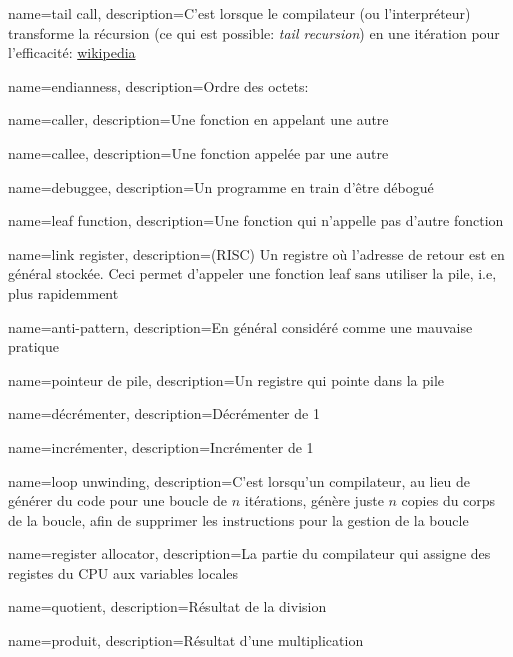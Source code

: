 {
  name={tail call},
  description={C'est lorsque le compilateur (ou l'interpréteur) transforme la récursion (ce qui est possible: \emph{tail recursion})
  en une itération pour l'efficacité: \href{http://en.wikipedia.org/wiki/Tail_call}{wikipedia}}
}

{
  name=endianness,
  description={Ordre des octets: }
}

{
  name=caller,
  description={Une fonction en appelant une autre}
}

{
  name=callee,
  description={Une fonction appelée par une autre}
}

{
  name=debuggee,
  description={Un programme en train d'être débogué}
}

{
  name=leaf function,
  description={Une fonction qui n'appelle pas d'autre fonction}
}

{
  name=link register,
  description={(RISC) Un registre où l'adresse de retour est en général stockée. Ceci permet
  d'appeler une fonction leaf sans utiliser la pile, i.e, plus rapidemment}
}

{
  name=anti-pattern,
  description={En général considéré comme une mauvaise pratique}
}

{
  name=pointeur de pile,
  description={Un registre qui pointe dans la pile}
}

{
  name=décrémenter,
  description={Décrémenter de 1}
}

{
  name=incrémenter,
  description={Incrémenter de 1}
}

{
  name=loop unwinding,
  description={C'est lorsqu'un compilateur, au lieu de générer du code pour une boucle de
  $n$ itérations, génère juste $n$ copies du corps de la boucle, afin de supprimer
  les instructions pour la gestion de la boucle}
}

{
  name=register allocator,
  description={La partie du compilateur qui assigne des registes du CPU aux variables locales}
}

{
  name=quotient,
  description={Résultat de la division}
}

{
  name=produit,
  description={Résultat d'une multiplication}
}

